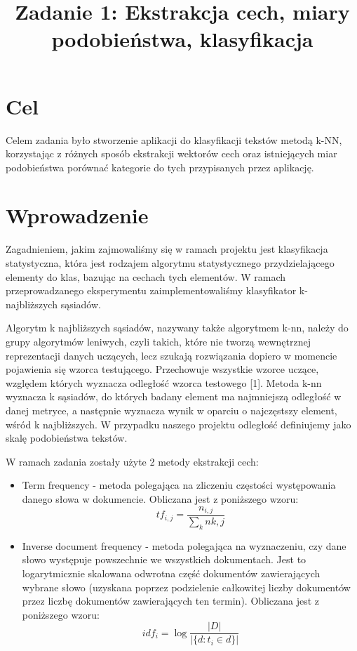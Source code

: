 \documentclass{classrep}
\author{
\studentinfo{Justyna Hubert}{210200} \and
\studentinfo{Karol Podlewski}{210294}
}
\title{Zadanie 1: Ekstrakcja cech, miary podobieństwa, klasyfikacja}
\begin{document}
\maketitle

\section{Cel}
Celem zadania było stworzenie aplikacji do klasyfikacji tekstów metodą k-NN, korzystając z różnych sposób ekstrakcji wektorów cech oraz istniejących miar podobieństwa porównać kategorie do tych przypisanych przez aplikację.

\section{Wprowadzenie}	

Zagadnieniem, jakim zajmowaliśmy się w ramach projektu jest klasyfikacja statystyczna, która jest rodzajem algorytmu statystycznego przydzielającego elementy do klas, bazując na cechach tych elementów. W ramach przeprowadzanego eksperymentu zaimplementowaliśmy klasyfikator k-najbliższych sąsiadów. \newline

Algorytm k najbliższych sąsiadów, nazywany także algorytmem k-nn, należy do grupy algorytmów leniwych, czyli takich, które nie tworzą wewnętrznej reprezentacji danych uczących, lecz szukają rozwiązania dopiero w momencie pojawienia się wzorca testującego. Przechowuje wszystkie wzorce uczące, względem których wyznacza odległość wzorca testowego [1]. Metoda k-nn wyznacza k sąsiadów, do których badany element ma najmniejszą odległość w danej metryce, a następnie wyznacza wynik w oparciu o najczęstszy element, wśród k najbliższych. W przypadku naszego projektu odległość definiujemy jako skalę podobieństwa tekstów. \newline

W ramach zadania zostały użyte 2 metody ekstrakcji cech: \newline

\begin{itemize}

\item Term frequency - metoda polegająca na zliczeniu częstości występowania danego słowa w dokumencie. Obliczana jest z poniższego wzoru:
$$
tf_{i,j}
= \frac{n_{i,j}}{\sum_{k}n{k,j}}
$$

\item Inverse document frequency - metoda polegająca na wyznaczeniu, czy dane słowo występuje powszechnie we wszystkich dokumentach. Jest to logarytmicznie skalowana odwrotna część dokumentów zawierających wybrane słowo (uzyskana poprzez podzielenie całkowitej liczby dokumentów przez liczbę dokumentów zawierających ten termin). Obliczana jest z poniższego wzoru:
$$
idf_{i}
= \log\frac{|D|}{|\{d : t_{i} \in d\}|}
$$
\newline
\end{itemize}
\end{document}
